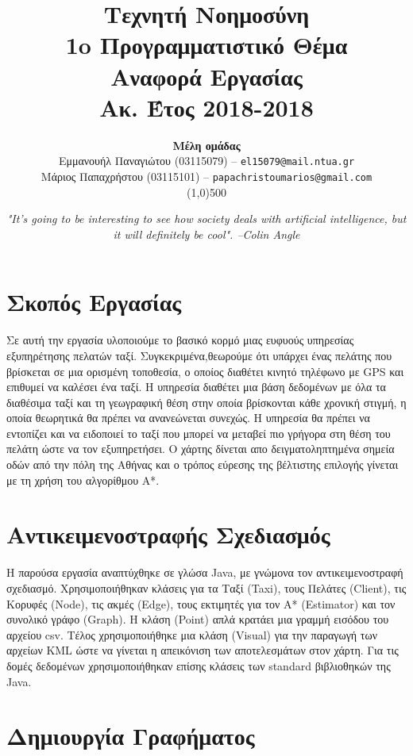 \documentclass[a4paper,oneside,12pt]{article}
\title{ \textbf{Τεχνητή Νοημοσύνη}  \\ 1o Προγραμματιστικό Θέμα \\ Αναφορά Εργασίας \\ \small{Ακ. Έτος 2018-2018}}
\author{\textbf{Μέλη ομάδας} \\ Εμμανουήλ Παναγιώτου (03115079) -- \texttt{el15079@mail.ntua.gr} \\  Μάριος Παπαχρήστου (03115101) -- \texttt{papachristoumarios@gmail.com}   \\ \line(1,0){500}}
\date{\emph{"It's going to be interesting to see how society deals with artificial intelligence, but it will definitely be cool". --Colin Angle}}
\begin{document}
\maketitle

\section{Σκοπός Εργασίας} 

Σε αυτή την εργασία υλοποιούμε το βασικό κορμό μιας ευφυούς υπηρεσίας εξυπηρέτησης πελατών ταξί. Συγκεκριμένα,θεωρούμε ότι υπάρχει ένας πελάτης που βρίσκεται σε μια ορισμένη τοποθεσία, ο οποίος διαθέτει κινητό τηλέφωνο με GPS και επιθυμεί να καλέσει ένα ταξί. Η υπηρεσία διαθέτει μια βάση δεδομένων με όλα τα διαθέσιμα ταξί και τη γεωγραφική θέση στην
οποία βρίσκονται κάθε χρονική στιγμή, η οποία θεωρητικά θα πρέπει να ανανεώνεται συνεχώς. Η υπηρεσία θα πρέπει να εντοπίζει και να ειδοποιεί το ταξί που μπορεί να μεταβεί πιο γρήγορα στη θέση του πελάτη ώστε να τον εξυπηρετήσει. Ο χάρτης δίνεται απο δειγματοληπτημένα σημεία οδών από την πόλη της Αθήνας και ο τρόπος εύρεσης της βέλτιστης επιλογής γίνεται με τη χρήση του αλγορίθμου Α*. 

\section{Αντικειμενοστραφής Σχεδιασμός} 

Η παρούσα εργασία αναπτύχθηκε σε γλώσα Java, με γνώμονα τον αντικειμενοστραφή σχεδιασμό. Χρησιμοποιήθηκαν κλάσεις για τα Ταξί (Taxi), τους Πελάτες (Client), τις Κορυφές (Node), τις ακμές (Edge), τους εκτιμητές για τον Α* (Estimator) και τον συνολικό γράφο (Graph). Η κλάση (Point) απλά κρατάει μια γραμμή εισόδου του αρχείου csv. Τέλος χρησιμοποιήθηκε μια κλάση (Visual) για την παραγωγή των αρχείων KML ώστε να γίνεται η απεικόνιση των αποτελεσμάτων στον χάρτη. Για τις δομές δεδομένων χρησιμοποιήθηκαν επίσης κλάσεις των standard βιβλιοθηκών της Java. 

\section{Δημιουργία Γραφήματος}
\end{document}
